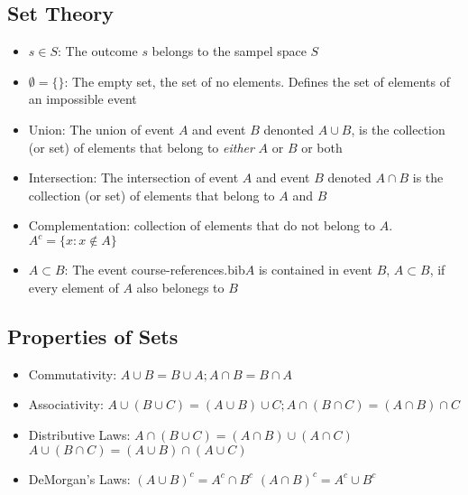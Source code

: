 \documentclass[12pt]{article}
\begin{document}
\subsection*{Set Theory}
\begin{itemize}

\item $s\in S$: The outcome $s$ belongs to the sampel space $S$ \cite[p.17]{classnotes.1}

\item $\emptyset=\{\}$: The empty set, the set of no elements. Defines the set of elements of an impossible event \cite[p.17]{classnotes.1}

\item Union: The union of event $A$ and event $B$ denonted $A \cup B$, is the collection (or set) of elements that belong to \emph{either} $A$ or $B$ or both \cite[p.17]{classnotes.1}

\item Intersection: The intersection of event $A$ and event $B$ denoted $A \cap B$ is the collection (or set) of elements that belong to $A$ and $B$ \cite[p.17]{classnotes.1}

\item Complementation: collection of elements that do not belong to $A$. $A^c=\{x:x\notin A\}$ \cite[p.17]{classnotes.1}

\item $A\subset B$: The event course-references.bib$A$ is contained in event $B$, $A\subset B$, if every element of $A$ also belonegs to $B$ \cite[p.17]{classnotes.1}

\end{itemize}

\subsection*{Properties of Sets \cite[p.19]{classnotes.1}}

\begin{itemize}

\item Commutativity: $A \cup B = B \cup A; A \cap B = B \cap A$

\item Associativity: $A\cup (B \cup C)=(A \cup B) \cup C; A \cap (B \cap C) = (A \cap B) \cap C$

\item Distributive Laws: $A \cap(B \cup C) = (A \cap B) \cup ( A \cap C)$ $ A \cup (B \cap C) = (A \cup B) \cap (A \cup C)$

\item DeMorgan's Laws:
$(A \cup B)^c=A^c \cap B^c$
$(A \cap B)^c=A^c\cup B^c$

\end{itemize}
\end{document}
